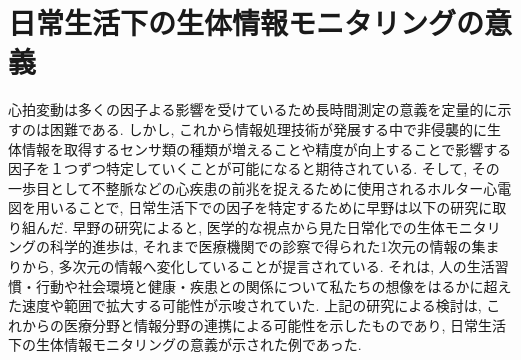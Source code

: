 \documentclass[report, 11pt, a4paper]{jsbook}
\begin{document}
\section{日常生活下の生体情報モニタリングの意義}
心拍変動は多くの因子よる影響を受けているため長時間測定の意義を定量的に示すのは困難である. しかし, これから情報処理技術が発展する中で非侵襲的に生体情報を取得するセンサ類の種類が増えることや精度が向上することで影響する因子を１つずつ特定していくことが可能になると期待されている. そして, その一歩目として不整脈などの心疾患の前兆を捉えるために使用されるホルター心電図を用いることで, 日常生活下での因子を特定するために早野は以下の研究に取り組んだ. 
早野の研究によると, 医学的な視点から見た日常化での生体モニタリングの科学的進歩は, それまで医療機関での診察で得られた1次元の情報の集まりから, 多次元の情報へ変化していることが提言されている\cite{everyday}. それは, 人の生活習慣・行動や社会環境と健康・疾患との関係について私たちの想像をはるかに超えた速度や範囲で拡大する可能性が示唆されていた. 上記の研究による検討は, これからの医療分野と情報分野の連携による可能性を示したものであり, 日常生活下の生体情報モニタリングの意義が示された例であった.
\end{document}
